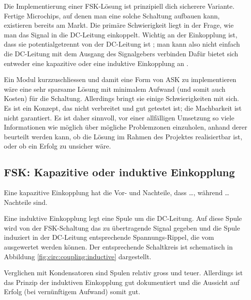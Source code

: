 Die  Implementierung   einer  FSK-L\"osung  ist  prinzipiell   dich  sicherere
Variante.  Fertige  Microchips, auf denen  man eine solche  Schaltung aufbauen
kann,  existieren  bereits  am  Markt. Die prim\"are  Schwierigkeit  liegt  in
der  Frage,  wie man  das  Signal  in  die DC-Leitung  einkoppelt. Wichtig  an
der  Einkopplung  ist,  dass  sie potentialgetrennt  von  der  DC-Leitung  ist
;  man kann  also  nicht  einfach die  DC-Leitung
mit   dem  Ausgang   des   Signalgebers  verbinden    Daf\"ur bietet sich entweder eine kapazitive oder eine
induktive Einkopplung an .

Ein  Modul kurzzuschliessen  und damit  eine  Form von  ASK zu  implementieren
w\"are  eine sehr  sparsame L\"osung  mit  minimalem Aufwand  (und somit  auch
Kosten) f\"ur die Schaltung. Allerdings  bringt sie einige Schwierigkeiten mit
sich. Es  ist  ein  Konzept,  das  nicht  verbreitet  und  gut  getestet  ist;
die  Machbarkeit  ist  nicht  garantiert. Es ist  daher  sinnvoll,  vor  einer
allf\"alligen Umsetzung so viele Informationen wie m\"oglich \"uber m\"ogliche
Problemzonen einzuholen, anhand  derer beurteilt werden kann,  ob die L\"osung
im Rahmen  des Projektes  realisiertbar ist,  oder ob  ein Erfolg  zu unsicher
w\"are.

\subsection{FSK: Kapazitive oder induktive Einkopplung}
\label{subsec:hw:fsk:kapaVsInduk}

Eine kapazitive Einkopplung hat die Vor- und Nachteile, dass \ldots, w\"ahrend
\ldots Nachteile sind.


Eine induktive Einkopplung legt eine  Spule um die DC-Leitung. Auf diese Spule
wird von der FSK-Schaltung das zu  \"ubertragende Signal gegeben und die Spule
induziert in  der DC-Leitung  entsprechende Spannungs-Rippel, die  vom \Master
ausgewertet werden k\"onnen. Der entsprechende  Schaltkreis ist schematisch in
Abbildung \ref{fig:circ:coupling:inductive} dargestellt.

Verglichen mit  Kondensatoren sind Spulen relativ  gross und teuer. Allerdings
ist das Prinzip  der induktiven Einkopplung gut dokumentiert  und die Aussicht
auf Erfolg (bei vern\"unftigem Aufwand) somit gut.

